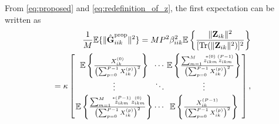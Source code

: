 \documentclass[journal,12pt,onecolumn]{IEEEtran}
\DeclareMathOperator{\Tr}{Tr}
\begin{document}
From \eqref{eq:proposed} and \eqref{eq:redefinition_of_z}, the first expectation can be written as
\begin{equation}\label{eq:first_term_expectation}
\begin{split}
\frac{1}{M}\mathbb{E}\{ \lVert \hat{\textbf{G}}_{iik}^{\text{prop}} \rVert^{2} \} = M P^{2} \beta_{iik}^{2} \mathbb{E} \left\lbrace \frac{\lVert \textbf{Z}_{ik} \rVert^2}{ [ \Tr ( \lVert \textbf{Z}_{ik} \rVert^{2} ) ]^{2}  } \right\rbrace \\ = \kappa \arraycolsep=1pt\def\arraystretch{1.5} \left[\begin{array}{ccc}
\mathbb{E} \left\lbrace \frac{ X_{ik}^{(0)} }{ \left( \sum_{p=0}^{P-1} X_{ik}^{(p)} \right)^{2} } \right\rbrace & \cdots & \mathbb{E} \left\lbrace \frac{ \sum_{m=1}^{M}{ \overset{*(0)}{{z}_{ikm}} \overset{(P-1)}{{z}_{ikm}} } }{\left( \sum_{p=0}^{P-1} X_{ik}^{(p)} \right)^{2}} \right\rbrace \\
\vdots & \ddots & \vdots \\ 
\mathbb{E} \left\lbrace \frac{ \sum_{m=1}^{M}{ \overset{*(P-1)}{{z}_{ikm}} \overset{(0)}{{z}_{ikm}} } }{\left( \sum_{p=0}^{P-1} X_{ik}^{(p)} \right)^{2}} \right\rbrace & \cdots & \mathbb{E} \left\lbrace \frac{ X_{ik}^{(P-1)} }{\left( \sum_{p=0}^{P-1} X_{ik}^{(p)} \right)^{2}} \right\rbrace  \end{array} \right],
\end{split}
\end{equation}
\end{document}
